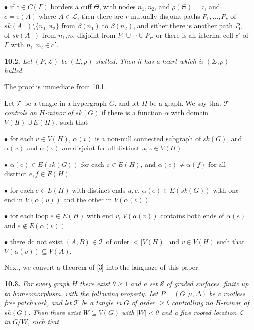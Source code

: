 \hspace*{12pt}$\bullet$ if $c \in C(\Gamma)$ borders a cuff $\Theta$, with nodes $n_1, n_2$, and $\rho(\Theta) = r$, and $c = e(A)$ where $A \in \mathcal{L}$, then there are $r$ mutually disjoint paths $P_1, \dots, P_r$ of $sk(A^-) \setminus \{n_1, n_2\}$ from $\beta(n_1)$ to $\beta(n_2)$, and either there is another path $P_0$ of $sk(A^-)$ from $n_1, n_2$ disjoint from $P_1 \cup \cdots \cup P_r$, or there is an internal cell $c'$ of $\Gamma$ with $n_1, n_2 \in \tilde{c}'$.

\textbf{10.2.} \textit{Let} $(P, \mathcal{L})$ \textit{be} $(\Sigma, \rho)$\textit{-shelled. Then it has a heart which is} $(\Sigma, \rho)$\textit{-hulled.}

The proof is immediate from 10.1.

Let $\mathcal{T}$ be a tangle in a hypergraph $G$, and let $H$ be a graph. We say that $\mathcal{T}$ \textit{controls an} $H$\textit{-minor of} $sk(G)$ if there is a function $\alpha$ with domain $V(H) \cup E(H)$, such that

\hspace*{12pt}$\bullet$ for each $v \in V(H)$, $\alpha(v)$ is a non-null connected subgraph of $sk(G)$, and $\alpha(u)$ and $\alpha(v)$ are disjoint for all distinct $u, v \in V(H)$

\hspace*{12pt}$\bullet$ $\alpha(e) \in E(sk(G))$ for each $e \in E(H)$, and $\alpha(e) \ne \alpha(f)$ for all distinct $e, f \in E(H)$

\hspace*{12pt}$\bullet$ for each $e \in E(H)$ with distinct ends $u, v$, $\alpha(e) \in E(sk(G))$ with one end in $V(\alpha(u))$ and the other in $V(\alpha(v))$

\hspace*{12pt}$\bullet$ for each loop $e \in E(H)$ with end $v$, $V(\alpha(v))$ contains both ends of $\alpha(e)$ and $e \notin E(\alpha(v))$

\hspace*{12pt}$\bullet$ there do not exist $(A, B) \in \mathcal{T}$ of order $< |V(H)|$ and $v \in V(H)$ such that $V(\alpha(v)) \subseteq V(A)$.

Next, we convert a theorem of [3] into the language of this paper.

\textbf{10.3.} \textit{For every graph} $H$ \textit{there exist} $\theta \ge 1$ \textit{and a set} $\mathcal{S}$ \textit{of graded surfaces, finite up to homeomorphism, with the following property. Let} $P = (G, \mu, \Delta)$ \textit{be a rootless free patchwork, and let} $\mathcal{T}$ \textit{be a tangle in} $G$ \textit{of order} $\ge \theta$ \textit{controlling no} $H$\textit{-minor of} $sk(G)$. \textit{Then there exist} $W \subseteq V(G)$ \textit{with} $|W| < \theta$ \textit{and a fine rooted location} $\mathcal{L}$ \textit{in} $G/W$, \textit{such that}

